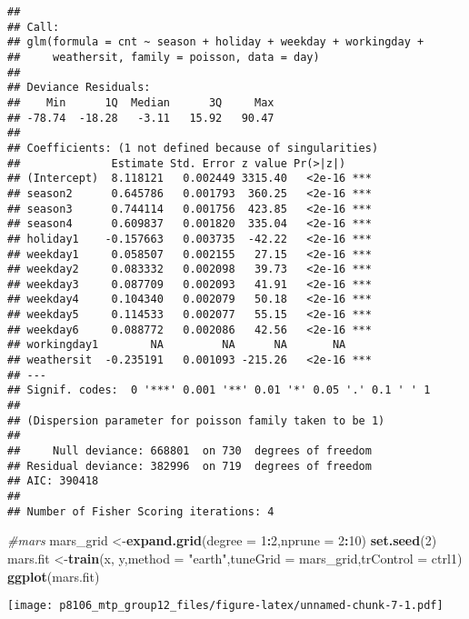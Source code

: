 \documentclass[]{article}
\newenvironment{Shaded}{\begin{snugshade}}{\end{snugshade}}
\newcommand{\KeywordTok}[1]{\textcolor[rgb]{0.13,0.29,0.53}{\textbf{#1}}}
\newcommand{\DataTypeTok}[1]{\textcolor[rgb]{0.13,0.29,0.53}{#1}}
\newcommand{\DecValTok}[1]{\textcolor[rgb]{0.00,0.00,0.81}{#1}}
\newcommand{\StringTok}[1]{\textcolor[rgb]{0.31,0.60,0.02}{#1}}
\newcommand{\CommentTok}[1]{\textcolor[rgb]{0.56,0.35,0.01}{\textit{#1}}}
\newcommand{\OperatorTok}[1]{\textcolor[rgb]{0.81,0.36,0.00}{\textbf{#1}}}
\newcommand{\NormalTok}[1]{#1}
\begin{document}
\begin{verbatim}
## 
## Call:
## glm(formula = cnt ~ season + holiday + weekday + workingday + 
##     weathersit, family = poisson, data = day)
## 
## Deviance Residuals: 
##    Min      1Q  Median      3Q     Max  
## -78.74  -18.28   -3.11   15.92   90.47  
## 
## Coefficients: (1 not defined because of singularities)
##              Estimate Std. Error z value Pr(>|z|)    
## (Intercept)  8.118121   0.002449 3315.40   <2e-16 ***
## season2      0.645786   0.001793  360.25   <2e-16 ***
## season3      0.744114   0.001756  423.85   <2e-16 ***
## season4      0.609837   0.001820  335.04   <2e-16 ***
## holiday1    -0.157663   0.003735  -42.22   <2e-16 ***
## weekday1     0.058507   0.002155   27.15   <2e-16 ***
## weekday2     0.083332   0.002098   39.73   <2e-16 ***
## weekday3     0.087709   0.002093   41.91   <2e-16 ***
## weekday4     0.104340   0.002079   50.18   <2e-16 ***
## weekday5     0.114533   0.002077   55.15   <2e-16 ***
## weekday6     0.088772   0.002086   42.56   <2e-16 ***
## workingday1        NA         NA      NA       NA    
## weathersit  -0.235191   0.001093 -215.26   <2e-16 ***
## ---
## Signif. codes:  0 '***' 0.001 '**' 0.01 '*' 0.05 '.' 0.1 ' ' 1
## 
## (Dispersion parameter for poisson family taken to be 1)
## 
##     Null deviance: 668801  on 730  degrees of freedom
## Residual deviance: 382996  on 719  degrees of freedom
## AIC: 390418
## 
## Number of Fisher Scoring iterations: 4
\end{verbatim}

\begin{Shaded}
\begin{Highlighting}[]
\CommentTok{#mars}
\NormalTok{mars_grid <-}\KeywordTok{expand.grid}\NormalTok{(}\DataTypeTok{degree =} \DecValTok{1}\OperatorTok{:}\DecValTok{2}\NormalTok{,}\DataTypeTok{nprune =} \DecValTok{2}\OperatorTok{:}\DecValTok{10}\NormalTok{)}
\KeywordTok{set.seed}\NormalTok{(}\DecValTok{2}\NormalTok{)}
\NormalTok{mars.fit <-}\KeywordTok{train}\NormalTok{(x, y,}\DataTypeTok{method =} \StringTok{"earth"}\NormalTok{,}\DataTypeTok{tuneGrid =}\NormalTok{ mars_grid,}\DataTypeTok{trControl =}\NormalTok{ ctrl1)}
\KeywordTok{ggplot}\NormalTok{(mars.fit)}
\end{Highlighting}
\end{Shaded}

\texttt{[image: p8106\_mtp\_group12\_files/figure-latex/unnamed-chunk-7-1.pdf]}

\begin{Shaded}
\end{Shaded}
\end{document}
